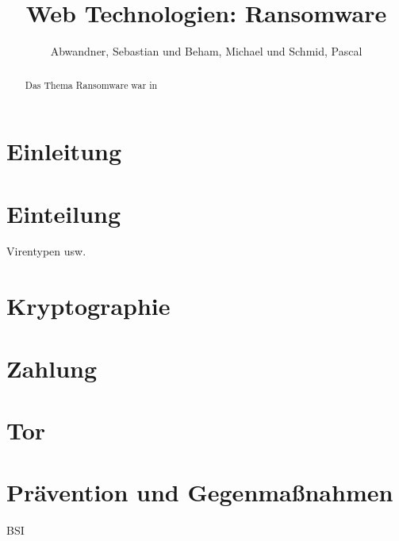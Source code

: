 \documentclass[runningheads,a4paper]{llncs}
\begin{document}


\title{Web Technologien: Ransomware}
{}

\author{Abwandner, Sebastian und Beham, Michael und Schmid, Pascal}


\maketitle

\begin{abstract}
Das Thema Ransomware war in
\end{abstract}

\section{Einleitung}\label{sec:intro}

\section{Einteilung}
Virentypen usw.

\section{Kryptographie}

\section{Zahlung}

\section{Tor}

\section{Prävention und Gegenmaßnahmen}
BSI \cite{BSI:Ransomware}
\end{document}
